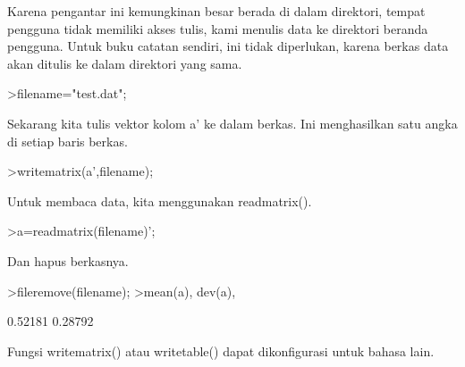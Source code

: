 \documentclass[a4paper,10pt]{article}
\begin{document}
\begin{eulernotebook}
\begin{eulercomment}
Karena pengantar ini kemungkinan besar berada di dalam direktori,
tempat pengguna tidak memiliki akses tulis, kami menulis data ke
direktori beranda pengguna. Untuk buku catatan sendiri, ini tidak
diperlukan, karena berkas data akan ditulis ke dalam direktori yang
sama.
\end{eulercomment}
\begin{eulerprompt}
>filename="test.dat";
\end{eulerprompt}
\begin{eulercomment}
Sekarang kita tulis vektor kolom a' ke dalam berkas. Ini menghasilkan
satu angka di setiap baris berkas.
\end{eulercomment}
\begin{eulerprompt}
>writematrix(a',filename);
\end{eulerprompt}
\begin{eulercomment}
Untuk membaca data, kita menggunakan readmatrix().
\end{eulercomment}
\begin{eulerprompt}
>a=readmatrix(filename)';
\end{eulerprompt}
\begin{eulercomment}
Dan hapus berkasnya.
\end{eulercomment}
\begin{eulerprompt}
>fileremove(filename);
>mean(a), dev(a),
\end{eulerprompt}
\begin{euleroutput}
  0.52181
  0.28792
\end{euleroutput}
\begin{eulercomment}
Fungsi writematrix() atau writetable() dapat dikonfigurasi untuk
bahasa lain.


\end{eulercomment}
\end{eulernotebook}
\end{document}
